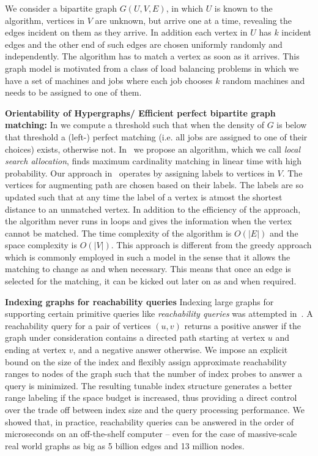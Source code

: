 We consider a bipartite graph $G(U,V,E)$, in which $U$ is known to the algorithm, vertices in $V$ are
unknown, but arrive one at a time, revealing the edges incident on
them as they arrive. In addition each vertex in $U$ has $k$ incident edges and the other end of such edges are chosen uniformly randomly and independently. The algorithm has to match a vertex
as soon as it arrives. This graph model is motivated from a class of load balancing problems in which we have a set of machines and jobs where each job chooses $k$ random machines and needs to be assigned to one of them.



\textbf{Orientability of Hypergraphs/ Efficient perfect bipartite graph matching: } In \cite{kCores} we compute a threshold such that when the density of $G$ is below that threshold a (left-) perfect matching (i.e. all jobs are assigned to one of their choices) exists, otherwise not. In~\cite{ballsbins} we propose an algorithm, which we call \emph{local search allocation}, finds maximum cardinality matching in linear time with high probability. Our approach in~\cite{ballsbins} operates by assigning labels to vertices in $V$. The vertices for augmenting path are chosen based on their labels. The labels are so updated such that at any time the label of a vertex is atmost the shortest distance to an unmatched vertex. In addition to the efficiency of the approach, the algorithm never runs in loops and gives the information when the vertex cannot be matched. The time complexity of the algorithm is $O(|E|)$ and the space complexity is $O(|V|)$. This approach is different from the greedy approach which is commonly employed in such a model in the sense that it allows the matching to change as and when necessary. This means that once an edge is selected for the matching, it can be kicked out later on as and when required.

\textbf{Indexing graphs for reachability queries} Indexing large graphs for supporting certain primitive queries like \emph{reachability queries} was attempted in~\cite{seufert2013ferrari}. A reachability query for a pair of vertices $(u,v)$ returns a positive answer if the graph under consideration contains a directed path starting at vertex $u$ and ending at vertex $v$, and a negative answer otherwise. We impose an explicit bound on the size of the index and flexibly assign approximate reachability ranges to nodes of the graph such that the number of index probes to answer a query is minimized. The resulting tunable index structure generates a better range labeling if the space budget is increased, thus providing a direct control over the trade off between index size and the query processing performance. We showed that, in practice, reachability queries can be answered in the order of microseconds on an off-the-shelf computer – even for the case of massive-scale real world graphs as big as 5 billion edges and 13 million nodes.


